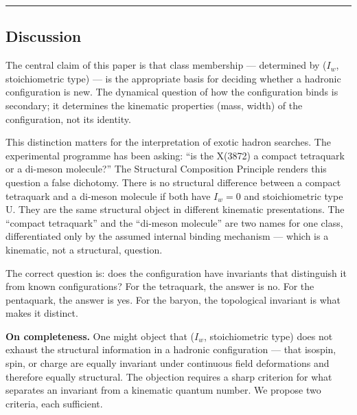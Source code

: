 \begin{center}\rule{0.5\linewidth}{0.5pt}\end{center}

\hypertarget{discussion}{%
\subsection{Discussion}\label{discussion}}

The central claim of this paper is that class membership ---
determined by (\(I_w\), stoichiometric type) --- is the appropriate
basis for deciding whether a hadronic configuration is new. The
dynamical question of how the configuration binds is secondary; it
determines the kinematic properties (mass, width) of the configuration,
not its identity.

This distinction matters for the interpretation of exotic hadron
searches. The experimental programme has been asking: ``is the X(3872) a
compact tetraquark or a di-meson molecule?'' The Structural Composition
Principle renders this question a false dichotomy. There is no
structural difference between a compact tetraquark and a di-meson
molecule if both have \(I_w = 0\) and stoichiometric type U. They are
the same structural object in different kinematic presentations. The
``compact tetraquark'' and the ``di-meson molecule'' are two names for
one class, differentiated only by the assumed internal
binding mechanism --- which is a kinematic, not a structural, question.

The correct question is: does the configuration have invariants that distinguish it from known configurations? For the
tetraquark, the answer is no. For the pentaquark, the answer is yes. For
the baryon, the topological invariant is what makes it distinct.

\textbf{On completeness.} One might object that (\(I_w\), stoichiometric
type) does not exhaust the structural information in a hadronic
configuration --- that isospin, spin, or charge are equally invariant
under continuous field deformations and therefore equally structural.
The objection requires a sharp criterion for what separates an invariant from a kinematic quantum number. We propose two criteria, each
sufficient.

